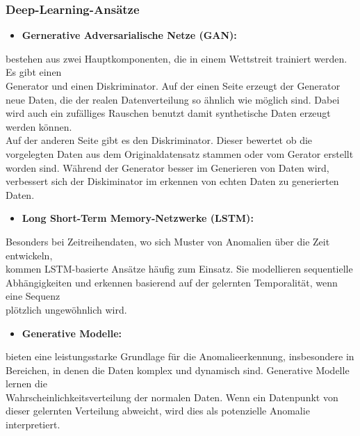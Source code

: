 \subsubsection*{Deep-Learning-Ansätze} 
\begin{itemize} \item \textbf{Gernerative Adversarialische Netze (GAN):}\end{itemize} bestehen aus zwei Hauptkomponenten, die in einem Wettstreit trainiert werden. Es gibt einen \\ Generator und einen Diskriminator. Auf der einen Seite erzeugt der Generator neue Daten, die der realen Datenverteilung so ähnlich wie möglich sind. Dabei wird auch ein zufälliges Rauschen benutzt damit synthetische Daten erzeugt werden können.\\
Auf der anderen Seite gibt es den  Diskriminator. Dieser bewertet ob die vorgelegten Daten aus dem Originaldatensatz stammen oder vom Gerator erstellt worden sind. Während der Generator besser im Generieren von Daten wird, verbessert sich der Diskiminator im erkennen von echten Daten zu generierten Daten\cite{GAN}. 
\newpage
\begin{itemize} \item \textbf{Long Short-Term Memory-Netzwerke (LSTM):}\end{itemize}
Besonders bei Zeitreihendaten, wo sich Muster von Anomalien über die Zeit entwickeln,\\ kommen LSTM-basierte Ansätze häufig zum Einsatz. Sie modellieren sequentielle \\ Abhängigkeiten und erkennen basierend auf der gelernten Temporalität, wenn eine Sequenz \\ plötzlich ungewöhnlich wird\cite{LIME}. 
\\
\begin{itemize} \item \textbf{Generative Modelle:} \end{itemize}
bieten eine leistungsstarke Grundlage für die Anomalieerkennung, insbesondere in Bereichen, in denen die Daten komplex und dynamisch sind. Generative Modelle lernen die \\ Wahrscheinlichkeitsverteilung der normalen Daten. Wenn ein Datenpunkt von dieser gelernten Verteilung abweicht, wird dies als potenzielle Anomalie interpretiert\cite{Preprocessing}.
\\
